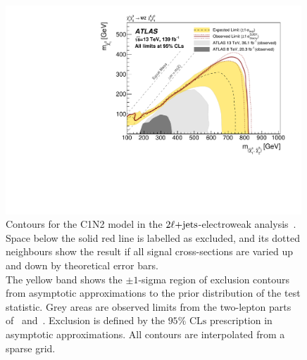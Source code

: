 \begin{figure}[tp]
\centering
\includegraphics[width=0.99\textwidth]{figures/2ljets_contours_c1n2.pdf}
\caption[
Contours for the C1N2 model in the $\twoljets$-electroweak analysis
]{%
Contours for the C1N2 model in the $\twoljets$-electroweak
analysis~\cite{atlas2022searches}.
\\[0.5em]
Space below the solid red line is labelled as excluded, and its dotted
neighbours show the result if all signal cross-sections are varied up and down
by theoretical error bars.
\\[0.5em]
The yellow band shows the $\pm1$-sigma region of exclusion contours
from asymptotic approximations to the prior distribution of the test statistic.
Grey areas are observed limits from the two-lepton parts
of~\cite{atlas_23l_SUSY_2016_24} and~\cite{atlas_2l_SUSY_2013_11}.
Exclusion is defined by the $95\%$ $\mathrm{CLs}$ prescription
in asymptotic approximations.
All contours are interpolated from a sparse grid.
}
\label{fig:2ljets_contours_c1n2}
\end{figure}

